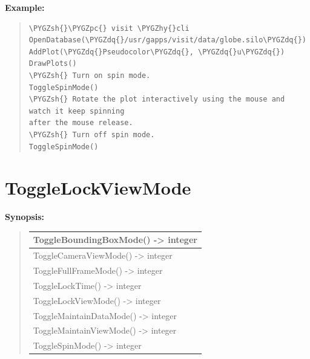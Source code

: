 \documentclass[letterpaper,10pt,english]{sphinxmanual}
\def\PYGZsh{\char`\#}
\def\PYGZpc{\char`\%}
\def\PYGZhy{\char`\-}
\def\PYGZdq{\char`\"}
\begin{document}
\begin{DUlineblock}{0em}
\item[] \textbf{Example:}
\item[] 
\end{DUlineblock}
\begin{quote}

\begin{Verbatim}[commandchars=\\\{\}]
\PYGZsh{}\PYGZpc{} visit \PYGZhy{}cli
OpenDatabase(\PYGZdq{}/usr/gapps/visit/data/globe.silo\PYGZdq{})
AddPlot(\PYGZdq{}Pseudocolor\PYGZdq{}, \PYGZdq{}u\PYGZdq{})
DrawPlots()
\PYGZsh{} Turn on spin mode.
ToggleSpinMode()
\PYGZsh{} Rotate the plot interactively using the mouse and watch it keep spinning
after the mouse release.
\PYGZsh{} Turn off spin mode.
ToggleSpinMode()
\end{Verbatim}
\end{quote}


\section{ToggleLockViewMode}
\label{functions:togglelockviewmode}
\begin{DUlineblock}{0em}
\item[] \textbf{Synopsis:}
\end{DUlineblock}
\begin{quote}

\begin{tabulary}{\linewidth}{|L|}
\hline

ToggleBoundingBoxMode() -\textgreater{} integer
\\
\hline
ToggleCameraViewMode() -\textgreater{} integer
\\
\hline
ToggleFullFrameMode() -\textgreater{} integer
\\
\hline
ToggleLockTime() -\textgreater{} integer
\\
\hline
ToggleLockViewMode() -\textgreater{} integer
\\
\hline
ToggleMaintainDataMode() -\textgreater{} integer
\\
\hline
ToggleMaintainViewMode() -\textgreater{} integer
\\
\hline
ToggleSpinMode() -\textgreater{} integer
\\
\hline\end{tabulary}

\end{quote}
\end{document}
